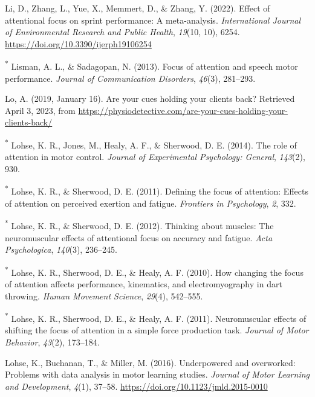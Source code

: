 \documentclass[
  man, donotrepeattitle,floatsintext]{apa7}
\newlength{\cslhangindent}
\newlength{\cslentryspacingunit} %
\newenvironment{CSLReferences}[2] %
 {%
  \setlength{\parindent}{0pt}
  \ifodd #1
  \let\oldpar\par
  \def\par{\hangindent=\cslhangindent\oldpar}
  \fi
  \setlength{\parskip}{#2\cslentryspacingunit}
 }%
 {}
\begin{document}
\begin{CSLReferences}{1}{0}
\leavevmode{}%
Li, D., Zhang, L., Yue, X., Memmert, D., \& Zhang, Y. (2022). Effect of attentional focus on sprint performance: {A} meta-analysis. \emph{International Journal of Environmental Research and Public Health}, \emph{19}(10, 10), 6254. \url{https://doi.org/10.3390/ijerph19106254}

\leavevmode{}%
\textsuperscript{*} Lisman, A. L., \& Sadagopan, N. (2013). Focus of attention and speech motor performance. \emph{Journal of Communication Disorders}, \emph{46}(3), 281--293.

\leavevmode{}%
Lo, A. (2019, January 16). Are your cues holding your clients back? Retrieved April 3, 2023, from \url{https://physiodetective.com/are-your-cues-holding-your-clients-back/}

\leavevmode{}%
\textsuperscript{*} Lohse, K. R., Jones, M., Healy, A. F., \& Sherwood, D. E. (2014). The role of attention in motor control. \emph{Journal of Experimental Psychology: General}, \emph{143}(2), 930.

\leavevmode{}%
\textsuperscript{*} Lohse, K. R., \& Sherwood, D. E. (2011). Defining the focus of attention: Effects of attention on perceived exertion and fatigue. \emph{Frontiers in Psychology}, \emph{2}, 332.

\leavevmode{}%
\textsuperscript{*} Lohse, K. R., \& Sherwood, D. E. (2012). Thinking about muscles: The neuromuscular effects of attentional focus on accuracy and fatigue. \emph{Acta Psychologica}, \emph{140}(3), 236--245.

\leavevmode{}%
\textsuperscript{*} Lohse, K. R., Sherwood, D. E., \& Healy, A. F. (2010). How changing the focus of attention affects performance, kinematics, and electromyography in dart throwing. \emph{Human Movement Science}, \emph{29}(4), 542--555.

\leavevmode{}%
\textsuperscript{*} Lohse, K. R., Sherwood, D. E., \& Healy, A. F. (2011). Neuromuscular effects of shifting the focus of attention in a simple force production task. \emph{Journal of Motor Behavior}, \emph{43}(2), 173--184.

\leavevmode{}%
Lohse, K., Buchanan, T., \& Miller, M. (2016). Underpowered and overworked: {Problems} with data analysis in motor learning studies. \emph{Journal of Motor Learning and Development}, \emph{4}(1), 37--58. \url{https://doi.org/10.1123/jmld.2015-0010}


\end{CSLReferences}
\end{document}
